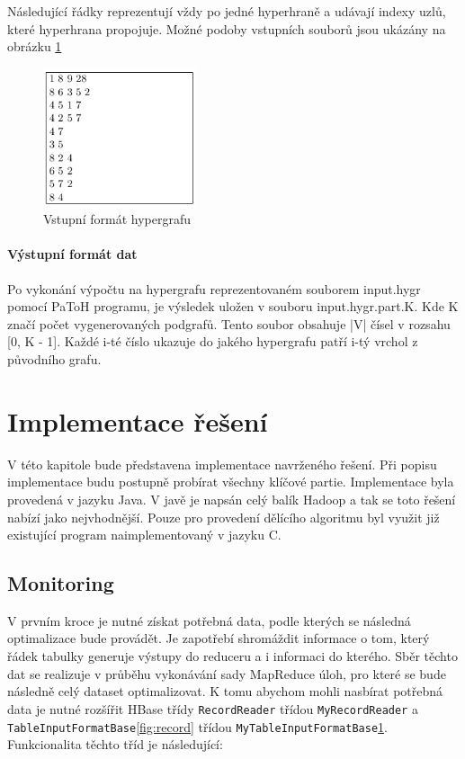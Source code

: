 \documentclass[thesis=M,czech]{FITthesis}[2012/06/26]
\begin{document}
Následující řádky reprezentují vždy po jedné hyperhraně a udávají indexy uzlů, které hyperhrana propojuje. Možné podoby vstupních souborů jsou ukázány na obrázku \ref{fig:input}

\begin{figure}\centering
	\includegraphics[width=0.4\textwidth, angle=0]{files/inputformat}
	\caption[Vstupní formát hypergrafu]
	{Vstupní formát hypergrafu}\label{fig:input}
\end{figure} 
\subsubsection{Výstupní formát dat}
Po vykonání výpočtu na hypergrafu reprezentovaném souborem input.hygr pomocí PaToH programu, je výsledek uložen v souboru input.hygr.part.K. Kde K značí počet vygenerovaných podgrafů. Tento soubor obsahuje |V| čísel v rozsahu [0, K - 1]. Každé i-té číslo ukazuje do jakého hypergrafu patří i-tý vrchol z původního grafu.




\chapter{Implementace řešení}
V této kapitole bude představena implementace navrženého řešení. Při popisu implementace budu postupně probírat všechny klíčové partie. Implementace byla provedená v jazyku Java. V javě je napsán celý balík Hadoop a tak se toto řešení nabízí jako nejvhodnější. Pouze pro provedení dělícího algoritmu byl využit již existující program naimplementovaný v jazyku C. 

\section{Monitoring}
V prvním kroce je nutné získat potřebná data, podle kterých se následná optimalizace bude provádět. Je zapotřebí shromáždit informace o tom, který řádek tabulky generuje výstupy do reduceru a i informaci do kterého. Sběr těchto dat se realizuje v průběhu vykonávání sady MapReduce úloh, pro které se bude následně celý dataset optimalizovat. K tomu abychom mohli nasbírat potřebná data je nutné rozšířit HBase třídy \texttt{RecordReader} třídou \texttt{MyRecordReader} a \texttt{TableInputFormatBase}\ref{fig:record} třídou \texttt{MyTableInputFormatBase}\ref{fig:input}. Funkcionalita těchto tříd je následující:
\end{document}
